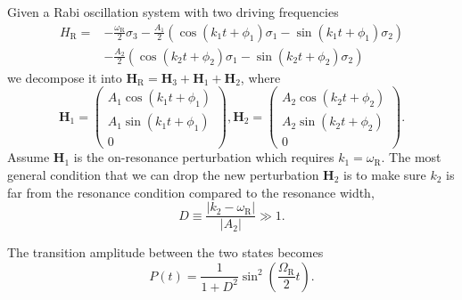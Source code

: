 \documentclass[%
reprint,
 amsmath,amssymb,
 prd,
]{revtex4-1}
\newcommand{\RD}{D}
\begin{document}
Given a Rabi oscillation system with two driving frequencies
\begin{align*}
    H_{\mathrm R} =& -\frac{\omega_{\mathrm R}}{2}\sigma_3 - \frac{A_{1} }{2}  \left( \cos(k_{1} t +\phi_{1})\sigma_1  - \sin(k_{1} t +\phi_{1}) \sigma_2\right) \nonumber\\
    & - \frac{A_{2} }{2}  \left( \cos(k_{2} t +\phi_{2})\sigma_1  - \sin(k_{2} t +\phi_{2}) \sigma_2\right)
\end{align*}
we decompose it into $\mathbf{H}_{\mathrm R}=\mathbf{H}_3 + \mathbf{H}_{1} + \mathbf{H}_2$, where
\begin{equation*}
    \mathbf{H}_1 =  \begin{pmatrix}
     A_{1} \cos(k_{1}t+\phi_{1}) \\
     A_{1} \sin(k_{1}t+\phi_{1})  \\
     0
      \end{pmatrix},   \mathbf{H}_2 =  \begin{pmatrix}
     A_{2} \cos(k_{2}t+\phi_{2}) \\
     A_{2} \sin(k_{2}t+\phi_{2})  \\
     0
      \end{pmatrix}.
\end{equation*}
Assume $\mathbf{H}_1$ is the on-resonance perturbation which requires $k_1 = \omega_{\mathrm{R}}$. The most general condition that we can drop the new perturbation $\mathbf{H}_2$ is to make sure $k_2$ is far from the resonance condition compared to the resonance width,
\begin{equation}
\RD \equiv \frac{\lvert k_2 -\omega_{\mathrm R}\rvert}{\lvert A_2\rvert} \gg 1.
\end{equation}

The transition amplitude between the two states becomes
\begin{equation}
P(t) = \frac{1}{1+\RD^2}\sin^2(\frac{\Omega_{\mathrm{R}}}{2}t).
\end{equation}









\end{document}
